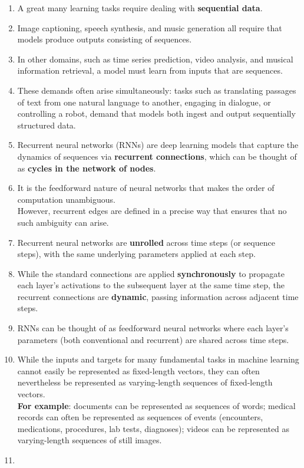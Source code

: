\begin{enumerate}
    \item A great many learning tasks require dealing with \textbf{sequential data}. 
    
    \item Image captioning, speech synthesis, and music generation all require that models produce outputs consisting of sequences. 
    
    \item In other domains, such as time series prediction, video analysis, and musical information retrieval, a model must learn from inputs that are sequences. 
    
    \item These demands often arise simultaneously: tasks such as translating passages of text from one natural language to another, engaging in dialogue, or controlling a robot, demand that models both ingest and output sequentially structured data.

    \item Recurrent neural networks (RNNs) are deep learning models that capture the dynamics of sequences via \textbf{recurrent connections}, which can be thought of as \textbf{cycles in the network of nodes}.

    \item It is the feedforward nature of neural networks that makes the order of computation unambiguous. \\
    However, recurrent edges are defined in a precise way that ensures that no such ambiguity can arise.

    \item Recurrent neural networks are \textbf{unrolled} across time steps (or sequence steps), with the same underlying parameters applied at each step. 
    
    \item While the standard connections are applied \textbf{synchronously} to propagate each layer’s activations to the subsequent layer at the same time step, the recurrent connections are \textbf{dynamic}, passing information across adjacent time steps.

    \item RNNs can be thought of as feedforward neural networks where each layer’s parameters (both conventional and recurrent) are shared across time steps.

    \item While the inputs and targets for many fundamental tasks in machine learning cannot easily be represented as fixed-length vectors, they can often nevertheless be represented as varying-length sequences of fixed-length vectors.\\
    \textbf{For example}: documents can be represented as sequences of words; medical records can often be represented as sequences of events (encounters, medications, procedures, lab tests, diagnoses); videos can be represented as varying-length sequences of still images.

    \item 
\end{enumerate}


